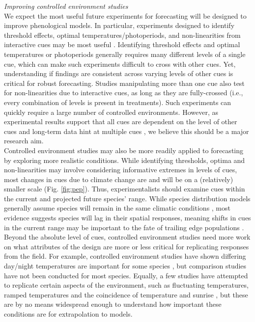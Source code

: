 \documentclass[11pt,letter]{article}
\begin{document}
\emph{Improving controlled environment studies}\\
We expect the most useful future experiments for forecasting will be designed to improve phenological models. In particular, experiments designed to identify threshold effects,  optimal temperatures/photoperiods, and non-linearities from interactive cues may be most useful \citep{iler2013}. Identifying threshold effects and optimal temperatures or photoperiods generally requires many different levels of a single cue, which can make such experiments difficult to cross with other cues. Yet, understanding if findings are consistent across varying levels of other cues is critical for robust forecasting. Studies manipulating more than one cue also test for non-linearities due to interactive cues, as long as they are fully-crossed (i.e., every combination of levels is present in treatments). Such experiments can quickly require a large number of controlled environments. However, as experimental results support that all cues are dependent on the level of other cues \citep{stearns1958,flynn2018} and long-term data hint at multiple cues \citep{fu2015}, we believe this should be a major research aim.\\

Controlled environment studies may also be more readily applied to forecasting by exploring more realistic conditions. While identifying thresholds, optima and non-linearities may involve considering informative extremes in levels of cues, most changes in cues due to climate change are and will be on a (relatively) smaller scale (Fig. \ref{fig:pep}). Thus, experimentalists should examine cues within the current and projected future species' range. While species distribution models generally assume species will remain in the same climatic conditions \citep{elith2009species}, most evidence suggests species will lag in their spatial responses, meaning shifts in cues in the current range may be important to the fate of trailing edge populations \citep{bertrand2011changes,lenoir2015climate,savage2015elevational}. \\ %

Beyond the absolute level of cues, controlled environment studies need more work on what attributes of the design are more or less critical for replicating responses from the field. For example, controlled environment studies have shown differing day/night temperatures are important for some species \citep{heuvelink1989influence,abrol1996effects,Thingnaes2003,pressman2006exposing}, but comparison studies have not been conducted for most species. Equally, a few studies have attempted to replicate certain aspects of the environment, such as fluctuating temperatures, ramped temperatures and the coincidence of temperature and sunrise \citep{erwin1998}, but these are by no means widespread enough to understand how important these conditions are for extrapolation to models. \\
\end{document}
